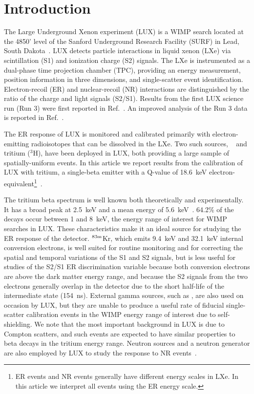 \section{Introduction}

The Large Underground Xenon experiment (LUX) is a WIMP search located at the 4850' level of the Sanford Underground Research Facility (SURF) in Lead, South Dakota~\cite{lux-nim}. LUX detects particle interactions in liquid xenon (LXe) via scintillation (S1) and ionization charge (S2) signals. The LXe is instrumented as a dual-phase time projection chamber (TPC), providing an energy measurement, position information in three dimensions, and single-scatter event identification. Electron-recoil (ER) and nuclear-recoil (NR) interactions are distinguished by the ratio of the charge and light signals (S2/S1). Results from the first LUX science run (Run 3) were first reported in Ref.~\cite{lux-prl}. An improved analysis of the Run 3 data is reported in Ref.~\cite{lux-reanalysis}.

The ER response of LUX is monitored and calibrated primarily with electron-emitting radioisotopes that can be dissolved in the LXe. Two such sources,  \krsrc~\cite{Kastens:2009rt, Baudis} and tritium ($^{3}$H), have been deployed in LUX, both providing a large sample of spatially-uniform events. In this article we report results from the calibration of LUX with tritium, a single-beta emitter with a Q-value of 18.6~keV electron-equivalent\footnote{ER events and NR events generally have different energy scales in LXe. In this article we interpret all events using the ER energy scale.}~\cite{Tritium_Q}. 

The tritium beta spectrum is well known both theoretically and experimentally. It has a broad peak at 2.5~keV and a mean energy of 5.6~keV~\cite{Tritium_Mean,Tritium_Eq,Drexlin:2013lha}. 64.2\% of the decays occur between 1 and 8~keV, the energy range of interest for WIMP searches in LUX. These characteristics make it an ideal source for studying the ER response of the detector.  $\rm ^{83m}$Kr, which emits 9.4~keV and 32.1~keV internal conversion electrons, is well suited for routine monitoring and for correcting the spatial and temporal variations of the S1 and S2 signals, but is less useful for studies of the S2/S1 ER discrimination variable because both conversion electrons are above the dark matter energy range, and because the S2 signals from the two electrons generally overlap in the detector due to the short half-life of the intermediate state (154~ns). External gamma sources, such as \cssrc,  are also used on occasion by LUX, but they are unable to produce a useful rate of fiducial single-scatter calibration events in the WIMP energy range of interest due to self-shielding. We note that the most important background in LUX is due to Compton scatters, and such events are expected to have similar properties to beta decays in the tritium energy range. Neutron sources and a neutron generator are also employed by LUX to study the response to NR events~\cite{DD-paper}.

